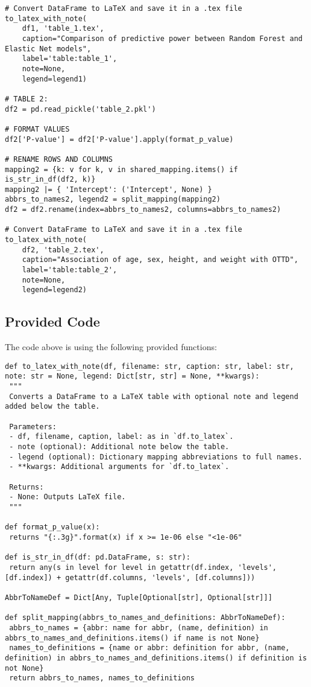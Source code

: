 \documentclass[11pt]{article}
\begin{document}
\begin{verbatim}
# Convert DataFrame to LaTeX and save it in a .tex file
to_latex_with_note(
    df1, 'table_1.tex',
    caption="Comparison of predictive power between Random Forest and Elastic Net models", 
    label='table:table_1',
    note=None,
    legend=legend1)

# TABLE 2:
df2 = pd.read_pickle('table_2.pkl')

# FORMAT VALUES
df2['P-value'] = df2['P-value'].apply(format_p_value)

# RENAME ROWS AND COLUMNS 
mapping2 = {k: v for k, v in shared_mapping.items() if is_str_in_df(df2, k)}
mapping2 |= { 'Intercept': ('Intercept', None) }
abbrs_to_names2, legend2 = split_mapping(mapping2)
df2 = df2.rename(index=abbrs_to_names2, columns=abbrs_to_names2)

# Convert DataFrame to LaTeX and save it in a .tex file
to_latex_with_note(
    df2, 'table_2.tex',
    caption="Association of age, sex, height, and weight with OTTD", 
    label='table:table_2',
    note=None,
    legend=legend2)

\end{verbatim}

\subsection{Provided Code}
The code above is using the following provided functions:

\begin{verbatim}
def to_latex_with_note(df, filename: str, caption: str, label: str, note: str = None, legend: Dict[str, str] = None, **kwargs):
 """
 Converts a DataFrame to a LaTeX table with optional note and legend added below the table.

 Parameters:
 - df, filename, caption, label: as in `df.to_latex`.
 - note (optional): Additional note below the table.
 - legend (optional): Dictionary mapping abbreviations to full names.
 - **kwargs: Additional arguments for `df.to_latex`.

 Returns:
 - None: Outputs LaTeX file.
 """

def format_p_value(x):
 returns "{:.3g}".format(x) if x >= 1e-06 else "<1e-06"

def is_str_in_df(df: pd.DataFrame, s: str):
 return any(s in level for level in getattr(df.index, 'levels', [df.index]) + getattr(df.columns, 'levels', [df.columns]))

AbbrToNameDef = Dict[Any, Tuple[Optional[str], Optional[str]]]

def split_mapping(abbrs_to_names_and_definitions: AbbrToNameDef):
 abbrs_to_names = {abbr: name for abbr, (name, definition) in abbrs_to_names_and_definitions.items() if name is not None}
 names_to_definitions = {name or abbr: definition for abbr, (name, definition) in abbrs_to_names_and_definitions.items() if definition is not None}
 return abbrs_to_names, names_to_definitions

\end{verbatim}
\end{document}
